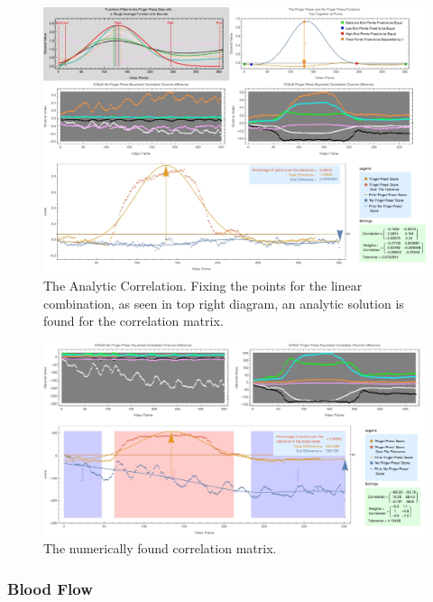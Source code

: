 \begin{figure}[tbph]
\centering
\includegraphics[width=0.95\linewidth]{Chapter4/Figs/anyliticCorrelationGrfx}
\caption[The Analytic Correlation.]{The Analytic Correlation. Fixing the points for the linear combination, as seen in top right diagram, an analytic solution is found for the correlation matrix.}
\label{fig:anyliticcorrelationgrfx}
\end{figure}
\begin{figure}[tbph]
\centering
\includegraphics[width=0.95\linewidth]{Chapter4/Figs/numericCorrelationGrfx}
\caption{The numerically found correlation matrix.}
\label{fig:numericcorrelationgrfx}
\end{figure}


\subsubsection{Blood Flow}\label{sec:BloodFlow}

